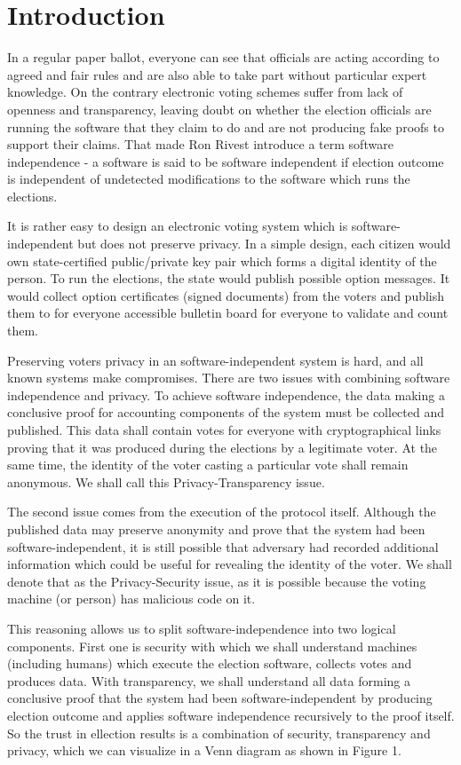 \documentclass[12pt,a4paper]{article}
\let\Oldsection\section
\renewcommand{\section}{\FloatBarrier\Oldsection}
\begin{document}
\section{Introduction}
In a regular paper ballot, everyone can see that officials are acting according to agreed and fair rules and are also able to take part without particular expert knowledge. On the contrary electronic voting schemes suffer from lack of openness and transparency, leaving doubt on whether the election officials are running the software that they claim to do and are not producing fake proofs to support their claims. That made Ron Rivest introduce a term software independence - a software is said to be software independent if election outcome is independent of undetected modifications to the software which runs the elections.\par
It is rather easy to design an electronic voting system which is software-independent but does not preserve privacy. In a simple design, each citizen would own state-certified public/private key pair which forms a digital identity of the person. To run the elections, the state would publish possible option messages. It would collect option certificates (signed documents) from the voters and publish them to for everyone accessible bulletin board for everyone to validate and count them.\par
Preserving voters privacy in an software-independent system is hard, and all known systems make compromises. There are two issues with combining software independence and privacy. To achieve software independence, the data making a conclusive proof for accounting components of the system must be collected and published. This data shall contain votes for everyone with cryptographical links proving that it was produced during the elections by a legitimate voter. At the same time, the identity of the voter casting a particular vote shall remain anonymous. We shall call this Privacy-Transparency issue.\par
The second issue comes from the execution of the protocol itself. Although the published data may preserve anonymity and prove that the system had been software-independent, it is still possible that adversary had recorded additional information which could be useful for revealing the identity of the voter. We shall denote that as the Privacy-Security issue, as it is possible because the voting machine (or person) has malicious code on it.\par
This reasoning allows us to split software-independence into two logical components. First one is security with which we shall understand machines (including humans) which execute the election software, collects votes and produces data. With transparency, we shall understand all data forming a conclusive proof that the system had been software-independent by producing election outcome and applies software independence recursively to the proof itself. So the trust in ellection results is a combination of security, transparency and privacy, which we can visualize in a Venn diagram as shown in Figure 1.\par
\end{document}
